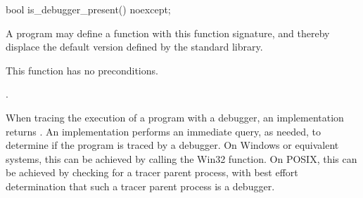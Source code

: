 %
\begin{itemdecl}
bool is_debugger_present() noexcept;
\end{itemdecl}

\begin{itemdescr}
\pnum
\replaceable
A \Cpp{} program may define a function with this function signature, and
thereby displace the default version defined by the \Cpp{} standard library.

\pnum
\required
This function has no preconditions.

\pnum
{}
{}.

\begin{note}
When tracing the execution of a program with a debugger, an implementation
returns . An implementation performs an immediate query, as needed,
to determine if the program is traced by a debugger. On Windows or equivalent
systems, this can be achieved by calling the  Win32
function. On POSIX, this can be achieved by checking for a tracer parent process,
with best effort determination that such a tracer parent process is a debugger.
\end{note}

\end{itemdescr}
